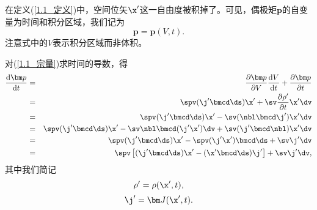 
在定义(\ref{1.1_定义})中，空间位矢$\x'$这一自由度被积掉了。可见，偶极矩$\bm p$的自变量为时间和积分区域，我们记为
\begin{equation}
    \bm p = \bm p (V,t). \label{1.1_宗量}
\end{equation}
注意式中的$V$表示积分区域而非体积。

对(\ref{1.1_宗量})求时间的导数，得
\begin{eqnarray}
    \frac{\mathrm d \bm p}{\mathrm d t} 
    & = & \label{1.1_5}
        \frac{\partial \bm p}{\partial V} \frac{\mathrm d V}{\mathrm d t} + \frac{\partial \bm p}{\partial t}\\
    & = & \label{1.1_6}
        \spv(\j'\bmcd\ds)\x' + \sv\frac{\partial\rho'}{\partial t}\x'\dv\\
    & = & \label{1.1_7}
        \spv(\j'\bmcd\ds)\x' - \sv(\nbl\bmcd\j')\x'\dv\\
    & = & \label{1.1_8}
        \spv(\j'\bmcd\ds)\x' - \sv\nbl\bmcd(\j'\x')\dv + \sv(\j'\bmcd\nbl)\x'\dv\\
    & = & \label{1.1_9}
        \spv(\j'\bmcd\ds)\x' - \spv(\j'\x')\bmcd\ds + \sv\j'\dv\\
    & = & \label{1.1_10}
        \spv\left[ (\j'\bmcd\ds)\x' - (\x'\bmcd\ds)\j' \right] + \sv\j'\dv,
\end{eqnarray}
其中我们简记
\begin{equation}
    \rho' = \rho(\x',t),
\end{equation}
\begin{equation}
    \j' = \bm J(\x',t).
\end{equation}

